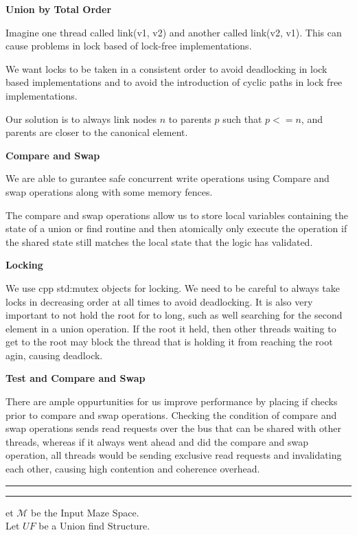 \documentclass[11pt]{article}
\newcommand{\question}[2] {\vspace{.25in} \hrule\vspace{0.5em}
\noindent{\bf #1: #2} \vspace{0.5em}
\hrule \vspace{.10in}}
\begin{document}
\textbf{Union by Total Order}

Imagine one thread called link(v1, v2) and another called link(v2, v1). This can cause problems in lock based of lock-free implementations. 

We want locks to be taken in a consistent order to avoid deadlocking in lock based implementations and to avoid the introduction of cyclic paths in lock free implementations.

Our solution is to always link nodes $n$ to parents $p$ such that $p <= n$, and parents are closer to the canonical element.


\textbf{Compare and Swap}

We are able to gurantee safe concurrent write operations using Compare and swap operations along with some memory fences.

The compare and swap operations allow us to store local variables containing the state of a union or find routine and then atomically only execute the operation if the shared state still matches the local state that the logic has validated.

\textbf{Locking}

We use cpp std:mutex objects for locking. We need to be careful to always take locks in decreasing order at all times to avoid deadlocking. It is also very important to not hold the root for to long, such as well searching for the second element in a union operation. If the root it held, then other threads waiting to get to the root may block the thread that is holding it from reaching the root agin, causing deadlock.

\newpage

\textbf{Test and Compare and Swap}

There are ample oppurtunities for us improve performance by placing if checks prior to compare and swap operations. Checking the condition of compare and swap operations sends read requests over the bus that can be shared with other threads, whereas if it always went ahead and did the compare and swap operation, all threads would be sending exclusive read requests and invalidating each other, causing high contention and coherence overhead.

\newpage

\question{Serial Maze Construction Algorithm}

Let $\mathcal{M}$ be the Input Maze Space.\\
Let $UF$ be a Union find Structure.\\
\end{document}
